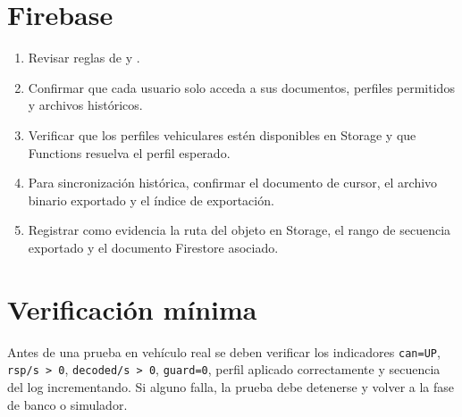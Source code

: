 \documentclass[12pt,letterpaper]{report}
\begin{document}
\section*{Firebase}

\begin{enumerate}
    \item Revisar reglas de  y .
    \item Confirmar que cada usuario solo acceda a sus documentos, perfiles permitidos y archivos históricos.
    \item Verificar que los perfiles vehiculares estén disponibles en Storage y que Functions resuelva el perfil esperado.
    \item Para sincronización histórica, confirmar el documento de cursor, el archivo binario exportado y el índice de exportación.
    \item Registrar como evidencia la ruta del objeto en Storage, el rango de secuencia exportado y el documento Firestore asociado.
\end{enumerate}

\section*{Verificación mínima}

Antes de una prueba en vehículo real se deben verificar los indicadores \texttt{can=UP}, \texttt{rsp/s > 0}, \texttt{decoded/s > 0}, \texttt{guard=0}, perfil aplicado correctamente y secuencia del log incrementando. Si alguno falla, la prueba debe detenerse y volver a la fase de banco o simulador.
\end{document}

